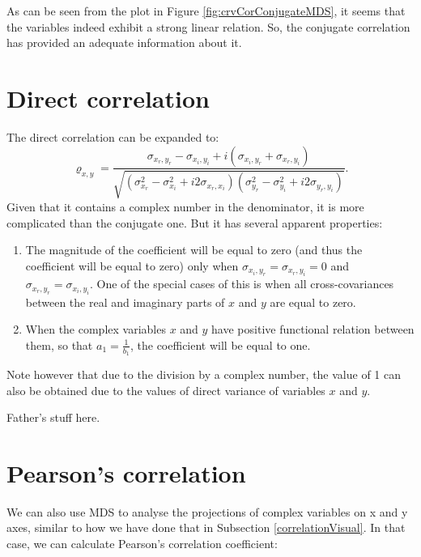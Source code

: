 \documentclass[
]{book}
\begin{document}
As can be seen from the plot in Figure \ref{fig:crvCorConjugateMDS}, it seems that the variables indeed exhibit a strong linear relation. So, the conjugate correlation has provided an adequate information about it.

\hypertarget{direct-correlation}{%
\section{Direct correlation}\label{direct-correlation}}

The direct correlation can be expanded to:
\begin{equation}
    {\varrho}_{x,y} = \frac{\sigma_{x_r, y_r} - \sigma_{x_i, y_i} + i (\sigma_{x_i, y_r} + \sigma_{x_r, y_i})}{\sqrt{(\sigma_{x_r}^2 - \sigma_{x_i}^2 + i2 \sigma_{x_r,x_i})(\sigma_{y_r}^2 - \sigma_{y_i}^2 + i2 \sigma_{y_r,y_i})}}.
    \label{eq:correlationPseudoExpanded}
\end{equation}
Given that it contains a complex number in the denominator, it is more complicated than the conjugate one. But it has several apparent properties:

\begin{enumerate}
\def\labelenumi{\arabic{enumi}.}
\item
  The magnitude of the coefficient will be equal to zero (and thus the coefficient will be equal to zero) only when \(\sigma_{x_i,y_r}=\sigma_{x_r,y_i}=0\) and \(\sigma_{x_r,y_r}=\sigma_{x_i,y_i}\). One of the special cases of this is when all cross-covariances between the real and imaginary parts of \(x\) and \(y\) are equal to zero.
\item
  When the complex variables \(x\) and \(y\) have positive functional relation between them, so that \(a_1 = \frac{1}{b_1}\), the coefficient will be equal to one.
\end{enumerate}

Note however that due to the division by a complex number, the value of 1 can also be obtained due to the values of direct variance of variables \(x\) and \(y\).

Father's stuff here.

\hypertarget{pearsons-correlation}{%
\section{Pearson's correlation}\label{pearsons-correlation}}

We can also use MDS to analyse the projections of complex variables on x and y axes, similar to how we have done that in Subsection \ref{correlationVisual}. In that case, we can calculate Pearson's correlation coefficient:
\end{document}

